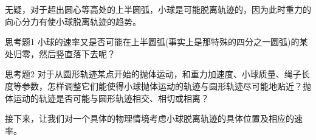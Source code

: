 无疑，对于超出圆心等高处的上半圆弧，小球是可能脱离轨迹的，因为此时重力的向心分力有使小球脱离轨迹的趋势。

\begin{exercise}{思考题1}
小球的速率又是否可能在上半圆弧(事实上是那特殊的四分之一圆弧)的某处归零，然后竖直落下去呢？
\end{exercise}

\begin{exercise}{思考题2}
对于从圆形轨迹某点开始的抛体运动，和重力加速度、小球质量、绳子长度等参数，怎样调整它们能使得小球抛体运动的轨迹与圆形轨迹尽可能地贴近？抛体运动的轨迹是否可能与圆形轨迹相交、相切或相离？
\end{exercise}

接下来，让我们对一个具体的物理情境考虑小球脱离轨迹的具体位置及相应的速率。